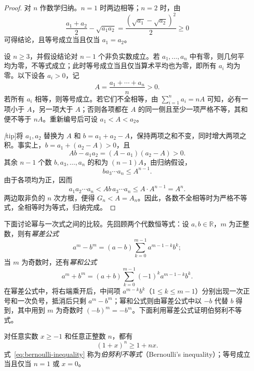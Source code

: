\begin{proof}
对 $n$ 作数学归纳。$n=1$ 时两边相等；$n=2$ 时，由
\[
    \frac{a_1+a_2}{2}-\sqrt{a_1a_2}
    =\frac{(\sqrt{a_1}-\sqrt{a_2})^2}{2}\geq 0
\]
可得结论，且等号成立当且仅当 $a_1=a_2$。

设 $n\geq 3$，并假设结论对 $n-1$ 个非负实数成立。若 $a_1,\ldots,a_n$ 中有零，则几何平均为零，不等式成立；此时等号成立当且仅当算术平均也为零，即所有 $a_i$ 均为零。以下设各 $a_i>0$，记
\[
    A=\frac{a_1+\cdots+a_n}{n}>0.
\]
若所有 $a_i$ 相等，则等号成立。若它们不全相等，由 $\sum_{i=1}^{n}a_i=nA$ 可知，必有一项小于 $A$，另一项大于 $A$；否则各项都在 $A$ 的同一侧且至少一项严格不等，其和便不等于 $nA$。重新编号后可设 $a_1<A<a_2$。

\emph[tip]{将 $a_1,a_2$ 替换为 $A$ 和 $b=a_1+a_2-A$，保持两项之和不变，同时增大两项之积。}事实上，$b=a_1+(a_2-A)>0$，且
\[
    Ab-a_1a_2=(A-a_1)(a_2-A)>0.
\]
其余 $n-1$ 个数 $b,a_3,\ldots,a_n$ 的和为 $(n-1)A$，由归纳假设，
\[
    ba_3\cdots a_n\leq A^{n-1}.
\]
由于各项均为正，因而
\[
    a_1a_2\cdots a_n
    <Ab\,a_3\cdots a_n
    \leq A\cdot A^{n-1}=A^n.
\]
两边取非负的 $n$ 次方根，便得 $G_n<A=A_n$。因此，各数不全相等时为严格不等式，全相等时为等式，归纳完成。
\end{proof}

下面讨论幂与一次式之间的比较。先回顾两个代数恒等式：设 $a,b\in\mathbb{R}$，$m$ 为正整数，则有\emph{幂差公式}
\begin{equation}
    a^m-b^m=(a-b)\sum_{k=0}^{m-1}a^{m-1-k}b^k;
    \label{eq:integer-power-difference}
\end{equation}
当 $m$ 为奇数时，还有\emph{幂和公式}
\begin{equation}
    a^m+b^m=(a+b)\sum_{k=0}^{m-1}(-1)^k a^{m-1-k}b^k.
    \label{eq:odd-integer-power-sum}
\end{equation}
在幂差公式中，将右端乘开后，中间项 $a^{m-k}b^k$（$1\leq k\leq m-1$）分别出现一次正号和一次负号，抵消后只剩 $a^m-b^m$；幂和公式则由幂差公式中以 $-b$ 代替 $b$ 得到，其中用到 $m$ 为奇数时 $(-b)^m=-b^m$。下面利用幂差公式证明伯努利不等式。

\begin{proposition}[伯努利不等式]
\label{prop:bernoulli-inequality}
对任意实数 $x\geq-1$ 和任意正整数 $n$，都有
\begin{equation}
    (1+x)^n\geq1+nx.
    \label{eq:bernoulli-inequality}
\end{equation}
式~\eqref{eq:bernoulli-inequality} 称为\emph{伯努利不等式}（Bernoulli's inequality）；等号成立当且仅当 $n=1$ 或 $x=0$。
\end{proposition}

